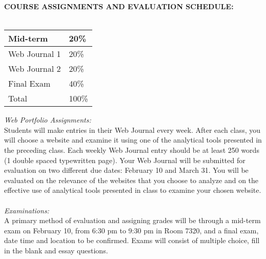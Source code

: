 \documentclass[10pt]{article}
\begin{document}
\textbf{COURSE ASSIGNMENTS AND EVALUATION SCHEDULE:}\\\\
\begin{tabular}{|l|l|}\hline
Mid-term & 20\% \\\hline
Web Journal 1 & 20\% \\\hline
Web Journal 2 & 20\% \\\hline
Final Exam & 40\% \\\hline\hline
Total & 100\% \\\hline
\end{tabular}


\textit{Web Portfolio Assignments:} \\
Students will make entries in their Web Journal every week. After each class, you will choose a website and examine it using one of the analytical tools presented in the preceding class. Each weekly Web Journal entry should be at least 250 words (1 double spaced typewritten page). Your Web Journal will be submitted for evaluation on two different due dates: February 10 and March 31. You will be evaluated on the relevance of the websites that you choose to analyze and on the effective use of analytical tools presented in class to examine your chosen website.\\\\
\textit{Examinations:} \\ 
A primary method of evaluation and assigning grades will be through a mid-term exam on February 10, from 6:30 pm to 9:30 pm in Room 7320, and a final exam, date time and location to be confirmed. Exams will consist of multiple choice, fill in the blank and essay questions.
\end{document}

